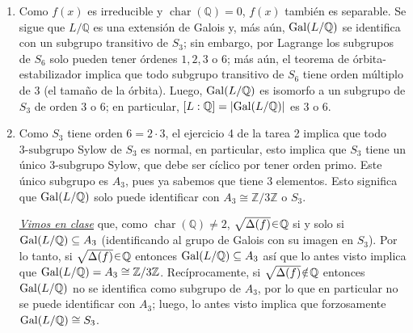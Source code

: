 \begin{sol}\hphantom{x}
\begin{enumerate}[label=\alph*)]
\item 
Como $f(x)$ es irreducible y $\operatorname{char}(\mathbb{Q}) = 0$, $f(x)$ también es separable. Se sigue que $L/\mathbb{Q}$ es una extensión de Galois y, más aún, $\operatorname{Gal}(L/\mathbb{Q})$ se identifica con un subgrupo transitivo de $S_3$; sin embargo, por Lagrange los subgrupos de $S_6$ solo pueden tener órdenes $1, 2,3$ o $6$; más aún, el teorema de órbita-estabilizador implica que todo subgrupo transitivo de $S_6$ tiene orden múltiplo de $3$ (el tamaño de la órbita). Luego, $\operatorname{Gal}(L/\mathbb{Q})$ es isomorfo a un subgrupo de $S_3$ de orden $3$ o $6$; en particular, $[L:\mathbb{Q}] = \abs{\operatorname{Gal}(L/\mathbb{Q})}$ es $3$ o $6$.

\item 
Como $S_3$ tiene orden $6=2 \cdot 3$, el ejercicio 4 de la tarea 2 implica que todo $3\text{-subgrupo}$ Sylow de $S_3$ es normal, en particular, esto implica que $S_3$ tiene un único $3\text{-subgrupo Sylow}$, que debe ser cíclico por tener orden primo. Este único subgrupo es $A_3$, pues ya sabemos que tiene $3$ elementos. Esto significa que $\operatorname{Gal}(L/\mathbb{Q})$ solo puede identificar con $A_3\cong \mathbb{Z}/3\mathbb{Z}$ o $S_3$.\par
\href{https://drive.google.com/file/d/11XpEmoZvQKK8-aPO5kTbNUl5Omyh1Ppl/view?usp=drive_link}{\emph{Vimos en clase}} que, como $\operatorname{char}(\mathbb{Q}) \neq 2$, $\sqrt{\Delta(f)} \en \mathbb{Q}$ si y solo si $\operatorname{Gal}(L/\mathbb{Q}) \subseteq A_3$ (identificando al grupo de Galois con su imagen en $S_3$). Por lo tanto, si $\sqrt{\Delta(f)} \en \mathbb{Q}$ entonces $\operatorname{Gal}(L/\mathbb{Q}) \subseteq A_3$ así que lo antes visto implica que $\operatorname{Gal}(L/\mathbb{Q}) = A_3 \cong \mathbb{Z}/3\mathbb{Z}$. Recíprocamente, si $\sqrt{\Delta(f)} \noten \mathbb{Q}$ entonces $\operatorname{Gal}(L/\mathbb{Q})$ no se identifica como subgrupo de $A_3$, por lo que en particular no se puede identificar con $A_3$; luego, lo antes visto implica que forzosamente $\operatorname{Gal}(L/\mathbb{Q}) \cong S_3$.


\end{enumerate}
\end{sol}
